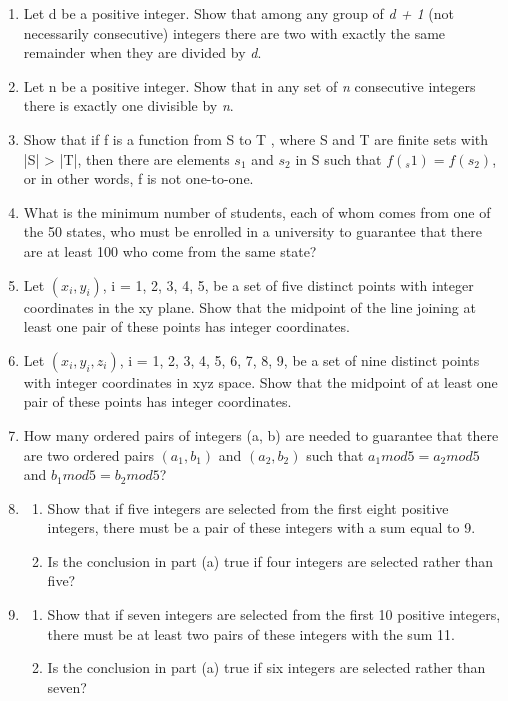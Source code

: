 \documentclass[11pt,a4paper]{book}
\newcommand{\onestaritem}{\refstepcounter{enumi}\item[$*$\theenumi.]}
\begin{document}
\begin{enumerate}
\item Let d be a positive integer.
Show that among any group of \emph{d + 1} (not necessarily consecutive) integers there are two with exactly the same remainder when they are divided by \emph{d}.
\item Let n be a positive integer.
Show that in any set of \emph{n} consecutive integers there is exactly one divisible by \emph{n}.
\item Show that if f is a function from S to T , where S and T are finite sets with |S| > |T|, then there are elements $s_1$ and $s_2$ in S such that $f(_s1) = f(s_2)$, or in other words, f is not one-to-one.
\item What is the minimum number of students, each of whom comes from one of the 50 states, who must be enrolled in a university to guarantee that there are at least 100 who come from the same state?
\onestaritem Let $(x_i, y_i )$, i = 1, 2, 3, 4, 5, be a set of five distinct points with integer coordinates in the xy plane.
Show that the midpoint of the line joining at least one pair of these points has integer coordinates.
\onestaritem Let $(x_i, y_i, z_i )$, i = 1, 2, 3, 4, 5, 6, 7, 8, 9, be a set of nine distinct points with integer coordinates in xyz space.
Show that the midpoint of at least one pair of these points has integer coordinates.
\item How many ordered pairs of integers (a, b) are needed to guarantee that there are two ordered pairs $(a_1, b_1)$ and $(a_2, b_2)$ such that $a_1 mod 5 = a_2 mod 5$ and $b_1 mod 5 = b_2 mod 5$?
\item \begin{enumerate}[label=(\alph*)]
\item Show that if five integers are selected from the first eight positive integers, there must be a pair of these integers with a sum equal to 9.
\item Is the conclusion in part (a) true if four integers are selected rather than five?
\end{enumerate}
\item \begin{enumerate}[label=(\alph*)]
\item Show that if seven integers are selected from the first 10 positive integers, there must be at least two pairs of these integers with the sum 11.
\item Is the conclusion in part (a) true if six integers are selected rather than seven?

\end{enumerate}
\end{enumerate}
\end{document}
